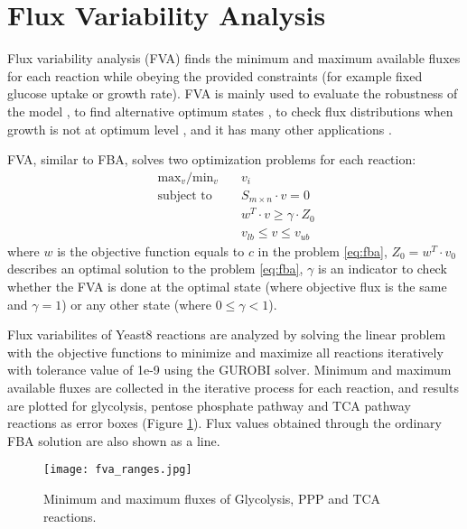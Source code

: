 \section{Flux Variability Analysis}
Flux variability analysis (FVA) finds the minimum and maximum available fluxes for each reaction while obeying the provided constraints (for example fixed glucose uptake or growth rate). FVA is mainly used to evaluate the robustness of the model \cite{thiele2010functional}, to find alternative optimum states \cite{mahadevan2003effects}, to check flux distributions when growth is not at optimum level \cite{reed2004genome}, and it has many other applications \cite{gudmundsson2010computationally}.

FVA, similar to FBA, solves two optimization problems for each reaction:
 \begin{align}
 \ \text{max}_v / \text{min}_v \quad & v_i \\
 \ \text{subject to} \quad & S_{m \times n} \cdot v=0 \\
 \ & w^T \cdot v \geq \gamma \cdot Z_0 \\
 \ & v_{lb} \leq v \leq v_{ub}
 \end{align}
\noindent where $w$ is the objective function equals to $c$ in the problem \ref{eq:fba}, $Z_0 = w^T \cdot v_0$ describes an optimal solution to the problem \ref{eq:fba}, $\gamma$ is an indicator to check whether the FVA is done at the optimal state (where objective flux is the same and $\gamma = 1$) or any other state (where $0 \leq \gamma < 1$).

Flux variabilites of Yeast8 reactions are analyzed by solving the linear problem with the objective functions to minimize and maximize all reactions iteratively with tolerance value of 1e-9 using the GUROBI solver. Minimum and maximum available fluxes are collected in the iterative process for each reaction, and results are plotted for glycolysis, pentose phosphate pathway and TCA pathway reactions as error boxes (Figure \ref{fig:fva}). Flux values obtained through the ordinary FBA solution are also shown as a line.

\begin{figure}[H]
\begin{center}
\texttt{[image: fva\_ranges.jpg]}
\end{center}
\caption[Minimum and maximum fluxes of Glycolysis, PPP and TCA reactions]{Minimum and maximum fluxes of Glycolysis, PPP and TCA reactions.}
\label{fig:fva}
\end{figure}


